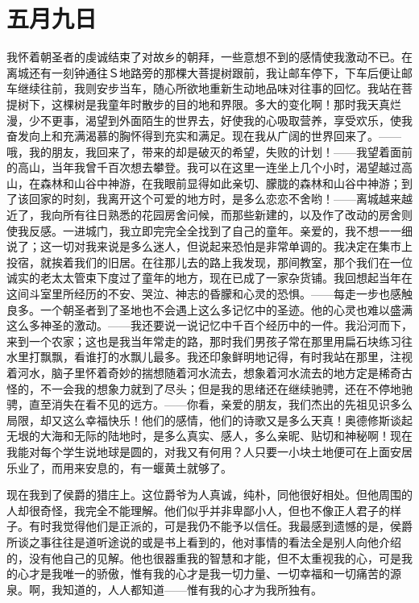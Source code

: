 \documentclass[12pt,oneside]{book}
\begin{document}
\chapter{五月九日}
\label{sec-4-3}
我怀着朝圣者的虔诚结束了对故乡的朝拜，一些意想不到的感情使我激动不已。在离城还有一刻钟通往Ｓ地路旁的那棵大菩提树跟前，我让邮车停下，下车后便让邮车继续往前，我则安步当车，随心所欲地重新生动地品味对往事的回忆。我站在菩提树下，这棵树是我童年时散步的目的地和界限。多大的变化啊！那时我天真烂漫，少不更事，渴望到外面陌生的世界去，好使我的心吸取营养，享受欢乐，使我奋发向上和充满渴慕的胸怀得到充实和满足。现在我从广阔的世界回来了。——哦，我的朋友，我回来了，带来的却是破灭的希望，失败的计划！——我望着面前的高山，当年我曾千百次想去攀登。我可以在这里一连坐上几个小时，渴望越过高山，在森林和山谷中神游，在我眼前显得如此亲切、朦胧的森林和山谷中神游；到了该回家的时刻，我离开这个可爱的地方时，是多么恋恋不舍哟！——离城越来越近了，我向所有往日熟悉的花园房舍问候，而那些新建的，以及作了改动的房舍则使我反感。一进城门，我立即完完全全找到了自己的童年。亲爱的，我不想一一细说了；这一切对我来说是多么迷人，但说起来恐怕是非常单调的。我决定在集市上投宿，就挨着我们的旧居。在往那儿去的路上我发现，那间教室，那个我们在一位诚实的老太太管束下度过了童年的地方，现在已成了一家杂货铺。我回想起当年在这间斗室里所经历的不安、哭泣、神志的昏朦和心灵的恐惧。——每走一步也感触良多。一个朝圣者到了圣地也不会遇上这么多记忆中的圣迹。他的心灵也难以盛满这么多神圣的激动。——我还要说一说记忆中千百个经历中的一件。我沿河而下，来到一个农家；这也是我当年常走的路，那时我们男孩子常在那里用扁石块练习往水里打飘飘，看谁打的水飘儿最多。我还印象鲜明地记得，有时我站在那里，注视着河水，脑子里怀着奇妙的揣想随着河水流去，想象着河水流去的地方定是稀奇古怪的，不一会我的想象力就到了尽头；但是我的思绪还在继续驰骋，还在不停地驰骋，直至消失在看不见的远方。——你看，亲爱的朋友，我们杰出的先祖见识多么局限，却又这么幸福快乐！他们的感情，他们的诗歌又是多么天真！奥德修斯谈起无垠的大海和无际的陆地时，是多么真实、感人，多么亲昵、贴切和神秘啊！现在我能对每个学生说地球是圆的，对我又有何用？人只要一小块土地便可在上面安居乐业了，而用来安息的，有一蝘黄土就够了。

现在我到了侯爵的猎庄上。这位爵爷为人真诚，纯朴，同他很好相处。但他周围的人却很奇怪，我完全不能理解。他们似乎并非卑鄙小人，但也不像正人君子的样子。有时我觉得他们是正派的，可是我仍不能予以信任。我最感到遗憾的是，侯爵所谈之事往往是道听途说的或是书上看到的，他对事情的看法全是别人向他介绍的，没有他自己的见解。他也很器重我的智慧和才能，但不太重视我的心，可是我的心才是我唯一的骄傲，惟有我的心才是我一切力量、一切幸福和一切痛苦的源泉。啊，我知道的，人人都知道——惟有我的心才为我所独有。
　　
\end{document}

